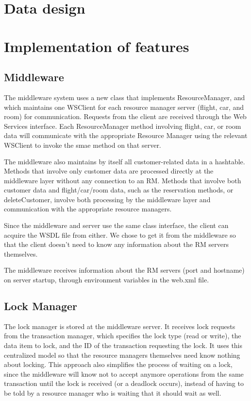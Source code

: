 \documentclass[11pt]{article}
\begin{document}
\section*{Data design}

\section*{Implementation of features}

\subsection*{Middleware}

The middleware system uses a new class that implements ResourceManager, and which maintains one WSClient for each resource manager server (flight, car, and room) for communication. Requests from the client are received through the Web Services interface. Each ResourceManager method involving flight, car, or room data will communicate with the appropriate Resource Manager using the relevant WSClient to invoke the smae method on that server.  \par

The middleware also maintains by itself all customer-related data in a hashtable. Methods that involve only customer data are processed directly at the middleware layer without any connection to an RM. Methods that involve both customer data and flight/car/room data, such as the reservation methods, or deleteCustomer, involve both processing by the middleware layer and communication with the appropriate resource managers.  \par

Since the middleware and server use the same class interface, the client can acquire the WSDL file from either. We chose to get it from the middleware so that the client doesn't need to know any information about the RM servers themselves.  \par

The middleware receives information about the RM servers (port and hostname) on server startup, through environment variables in the web.xml file.  \par

\subsection*{Lock Manager}

The lock manager is stored at the middleware server. It receives lock requests from the transaction manager, which specifies the lock type (read or write), the data item to lock, and the ID of the transaction requesting the lock. It uses this centralized model so that the resource managers themselves need know nothing about locking. This approach also simplifies the process of waiting on a lock, since the middleware will know not to accept anymore operations from the same transaction until the lock is received (or a deadlock occurs), instead of having to be told by a resource manager who is waiting that it should wait as well. \par
\end{document}
